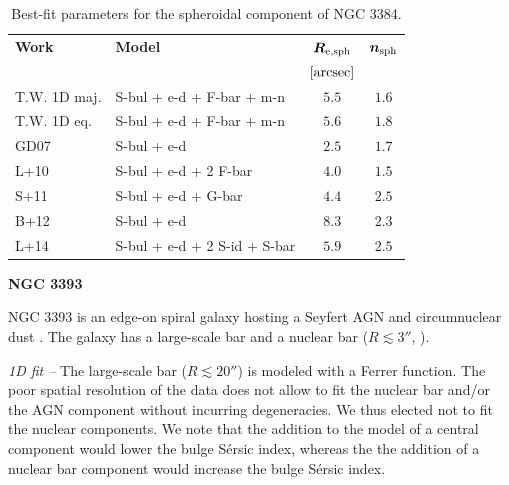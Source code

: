 \documentclass[preprint2]{emulateapj}
\begin{document}
  \begin{table}[h]
  \small
  \caption{Best-fit parameters for the spheroidal component of NGC 3384.}
  \begin{center}
  \begin{tabular}{llcc}
  \hline
  {\bf Work} & {\bf Model}   & $\bm R_{\rm e,sph}$    & $\bm n_{\rm sph}$ \\
    &  &  $[\rm arcsec]$ & \\
  \hline
  T.W. 1D maj. & S-bul + e-d + F-bar + m-n & $5.5$  &  $1.6$ \\
  T.W. 1D eq.  & S-bul + e-d + F-bar + m-n & $5.6$  &  $1.8$ \\
  \hline
  GD07         & S-bul + e-d		      & $2.5$  &  $1.7$ \\
  L+10         & S-bul + e-d + 2 F-bar        & $4.0$  &  $1.5$ \\
  S+11         & S-bul + e-d + G-bar	      & $4.4$  &  $2.5$ \\
  B+12         & S-bul + e-d		      & $8.3$  &  $2.3$ \\
  L+14         & S-bul + e-d + 2 S-id + S-bar & $5.9$  &  $2.5$ \\
  \hline
  \end{tabular}
  \end{center}
  \label{tab:n3384}
  \end{table}

  \clearpage\newpage\noindent
  {\bf NGC 3393 \\}

  NGC 3393 is an edge-on spiral galaxy hosting a Seyfert AGN \citep{diaz1988n3393} and 
  circumnuclear dust \citep{martini2003}.
  The galaxy has a large-scale bar and a nuclear bar ($R \lesssim 3''$, \citealt{erwin2004}).  

  \emph{1D fit -- }
  The large-scale bar ($R \lesssim 20''$) is modeled with a Ferrer function.
  The poor spatial resolution of the data does not allow to fit the nuclear bar and/or the AGN component 
  without incurring degeneracies.
  We thus elected not to fit the nuclear components.
  We note that the addition to the model of a central component would lower the bulge S\'ersic index,
  whereas the the addition of a nuclear bar component would increase the bulge S\'ersic index.
\end{document}
